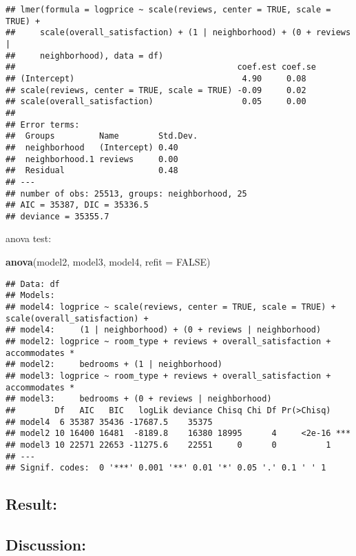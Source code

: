 \documentclass[]{article}
\newenvironment{Shaded}{\begin{snugshade}}{\end{snugshade}}
\newcommand{\KeywordTok}[1]{\textcolor[rgb]{0.13,0.29,0.53}{\textbf{#1}}}
\newcommand{\DataTypeTok}[1]{\textcolor[rgb]{0.13,0.29,0.53}{#1}}
\newcommand{\OtherTok}[1]{\textcolor[rgb]{0.56,0.35,0.01}{#1}}
\newcommand{\NormalTok}[1]{#1}
\begin{document}
\begin{verbatim}
## lmer(formula = logprice ~ scale(reviews, center = TRUE, scale = TRUE) + 
##     scale(overall_satisfaction) + (1 | neighborhood) + (0 + reviews | 
##     neighborhood), data = df)
##                                             coef.est coef.se
## (Intercept)                                  4.90     0.08  
## scale(reviews, center = TRUE, scale = TRUE) -0.09     0.02  
## scale(overall_satisfaction)                  0.05     0.00  
## 
## Error terms:
##  Groups         Name        Std.Dev.
##  neighborhood   (Intercept) 0.40    
##  neighborhood.1 reviews     0.00    
##  Residual                   0.48    
## ---
## number of obs: 25513, groups: neighborhood, 25
## AIC = 35387, DIC = 35336.5
## deviance = 35355.7
\end{verbatim}

anova test:

\begin{Shaded}
\begin{Highlighting}[]
\KeywordTok{anova}\NormalTok{(model2, model3, model4, }\DataTypeTok{refit =} \OtherTok{FALSE}\NormalTok{)}
\end{Highlighting}
\end{Shaded}

\begin{verbatim}
## Data: df
## Models:
## model4: logprice ~ scale(reviews, center = TRUE, scale = TRUE) + scale(overall_satisfaction) + 
## model4:     (1 | neighborhood) + (0 + reviews | neighborhood)
## model2: logprice ~ room_type + reviews + overall_satisfaction + accommodates * 
## model2:     bedrooms + (1 | neighborhood)
## model3: logprice ~ room_type + reviews + overall_satisfaction + accommodates * 
## model3:     bedrooms + (0 + reviews | neighborhood)
##        Df   AIC   BIC   logLik deviance Chisq Chi Df Pr(>Chisq)    
## model4  6 35387 35436 -17687.5    35375                            
## model2 10 16400 16481  -8189.8    16380 18995      4     <2e-16 ***
## model3 10 22571 22653 -11275.6    22551     0      0          1    
## ---
## Signif. codes:  0 '***' 0.001 '**' 0.01 '*' 0.05 '.' 0.1 ' ' 1
\end{verbatim}

\subsection{Result:}\label{result}

\subsection{Discussion:}\label{discussion}
\end{document}
